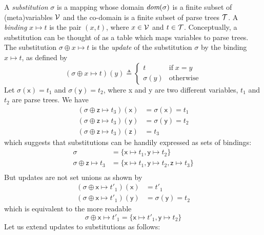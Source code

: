 A \emph{substitution} \(\sigma\) is a mapping whose domain
\(\text{\it dom}(\sigma)\) is a finite subset of (meta)variables \({\cal V}\)
and the co\hyp{}domain is a finite subset of parse trees \({\cal
T}\). A \emph{binding} \(x \mapsto t\) is the pair \((x, t)\), where
\(x \in {\cal V}\) and \(t \in {\cal T}\). Conceptually, a
substitution can be thought of as a table which maps variables to
parse trees. The substitution \(\sigma \oplus x \mapsto t\) is the
\emph{update} of the substitution \(\sigma\) by the binding \(x
\mapsto t\), as defined by
\begin{equation}
(\sigma \oplus x \mapsto t)(y) \triangleq
\begin{cases}
  t         & \text{if} \; x = y\\
  \sigma(y) & \text{otherwise}
\end{cases}
\label{model:oplus}
\end{equation}
Let \(\sigma(\textsf{x}) = t_1\) and \(\sigma(\textsf{y}) = t_2\),
where \textsf{x} and \textsf{y} are two different variables, \(t_1\)
and \(t_2\) are parse trees. We have
\begin{align*}
     (\sigma \oplus \textsf{z} \mapsto t_3)(\textsf{x})
  &= \sigma(\textsf{x}) = t_1\\
     (\sigma \oplus \textsf{z} \mapsto t_3)(\textsf{y})
  &= \sigma(\textsf{y}) = t_2\\
     (\sigma \oplus \textsf{z} \mapsto t_3)(\textsf{z})
  &= t_3
\end{align*}
which suggests that substitutions can be handily expressed as sets of
bindings:
\begin{align*}
  \sigma &= \{\textsf{x} \mapsto t_1, \textsf{y} \mapsto t_2\}\\
  \sigma \oplus \textsf{z} \mapsto t_3 &= \{\textsf{x} \mapsto t_1,
  \textsf{y} \mapsto t_2, \textsf{z} \mapsto t_3\}\\
\end{align*}
But updates are not set unions as shown by
\begin{align*}
     (\sigma \oplus \textsf{x} \mapsto t'_1)(\textsf{x})
  &= t'_1\\
     (\sigma \oplus \textsf{x} \mapsto t'_1)(\textsf{y})
  &= \sigma(\textsf{y}) = t_2
\end{align*}
which is equivalent to the more readable
\begin{equation*}
  \sigma \oplus \textsf{x} \mapsto t'_1
  = \{\textsf{x} \mapsto t'_1, \textsf{y} \mapsto t_2\}
\end{equation*}
Let us extend updates to substitutions as follows:
